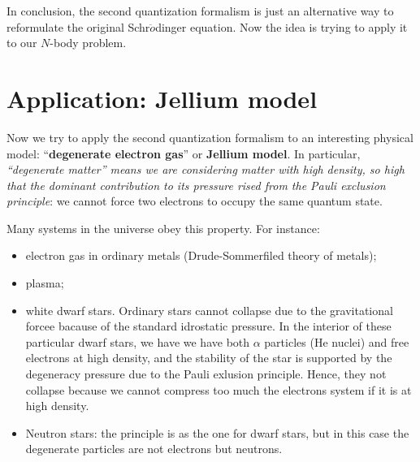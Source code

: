 \documentclass[../main/main.tex]{subfiles}
\begin{document}
In conclusion, the second quantization formalism is just an alternative way to reformulate the original Schr$\ddot{o}$dinger equation. Now the idea is trying to apply it to our \( N \)-body problem.









\section{Application: Jellium model}
Now we try to apply the second quantization formalism to an interesting physical model: “\textbf{degenerate electron gas}” or \textbf{Jellium model}.
In particular, \emph{ “degenerate matter” means we are considering matter with high density, so high that the dominant contribution to its pressure rised from the Pauli exclusion principle}: we cannot force two electrons to occupy the same quantum state.

Many systems in the universe obey this property. For instance:
\begin{itemize}
\item electron gas in ordinary metals (Drude-Sommerfiled theory of metals);
\item plasma;
\item white dwarf stars. Ordinary stars cannot collapse due to the gravitational forcee bacause of the standard idrostatic pressure. In the interior of these particular dwarf stars, we have we have both \( \alpha  \) particles (He nuclei) and free electrons at high density, and the stability of the star is supported by the degeneracy pressure due to the Pauli exlusion principle. Hence, they not collapse because we cannot compress too much the electrons system if it is at high density.
\item Neutron stars: the principle is as the one for dwarf stars, but in this case the degenerate particles are not electrons but neutrons.
\end{itemize}

\end{document}
